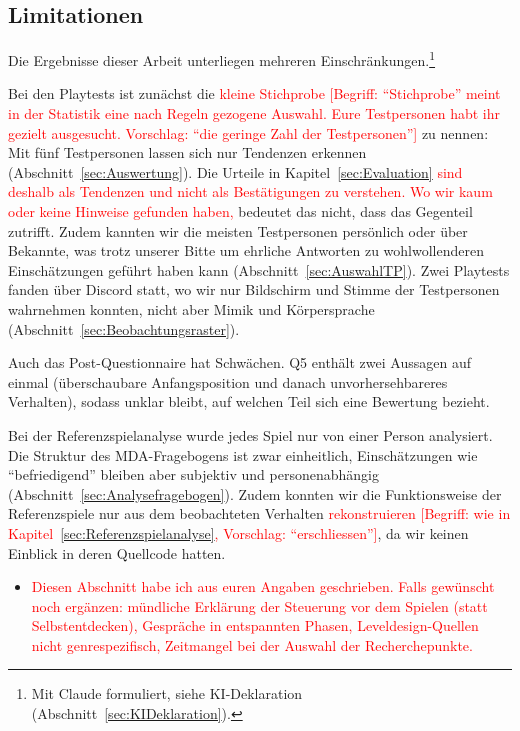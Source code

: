 \documentclass[../Main.tex]{subfiles}
\begin{document}
\subsection{Limitationen} \label{sec:Limitationen}

Die Ergebnisse dieser Arbeit unterliegen mehreren Einschränkungen.\footnote{Mit Claude formuliert, siehe KI-Deklaration (Abschnitt~\ref{sec:KIDeklaration}).}

Bei den Playtests ist zunächst die \textcolor{red}{kleine Stichprobe [Begriff: \enquote{Stichprobe} meint in der Statistik eine nach Regeln gezogene Auswahl. Eure Testpersonen habt ihr gezielt ausgesucht. Vorschlag: \enquote{die geringe Zahl der Testpersonen}]} zu nennen: Mit fünf Testpersonen lassen sich nur Tendenzen erkennen (Abschnitt~\ref{sec:Auswertung}). Die Urteile in Kapitel~\ref{sec:Evaluation} \textcolor{red}{sind deshalb als Tendenzen und nicht als Bestätigungen zu verstehen. Wo wir kaum oder keine Hinweise gefunden haben,} bedeutet das nicht, dass das Gegenteil zutrifft. Zudem kannten wir die meisten Testpersonen persönlich oder über Bekannte, was trotz unserer Bitte um ehrliche Antworten zu wohlwollenderen Einschätzungen geführt haben kann (Abschnitt~\ref{sec:AuswahlTP}). Zwei Playtests fanden über Discord statt, wo wir nur Bildschirm und Stimme der Testpersonen wahrnehmen konnten, nicht aber Mimik und Körpersprache (Abschnitt~\ref{sec:Beobachtungsraster}).

Auch das Post-Questionnaire hat Schwächen. Q5 enthält zwei Aussagen auf einmal (überschaubare Anfangsposition und danach unvorhersehbareres Verhalten), sodass unklar bleibt, auf welchen Teil sich eine Bewertung bezieht.

Bei der Referenzspielanalyse wurde jedes Spiel nur von einer Person analysiert. Die Struktur des MDA-Fragebogens ist zwar einheitlich, Einschätzungen wie \enquote{befriedigend} bleiben aber subjektiv und personenabhängig (Abschnitt~\ref{sec:Analysefragebogen}). Zudem konnten wir die Funktionsweise der Referenzspiele nur aus dem beobachteten Verhalten \textcolor{red}{rekonstruieren [Begriff: wie in Kapitel~\ref{sec:Referenzspielanalyse}, Vorschlag: \enquote{erschliessen}]}, da wir keinen Einblick in deren Quellcode hatten.

\begin{itemize}[leftmargin=1.5cm]
    \item \textcolor{red}{Diesen Abschnitt habe ich aus euren Angaben geschrieben. Falls gewünscht noch ergänzen: mündliche Erklärung der Steuerung vor dem Spielen (statt Selbstentdecken), Gespräche in entspannten Phasen, Leveldesign-Quellen nicht genrespezifisch, Zeitmangel bei der Auswahl der Recherchepunkte.}
\end{itemize}
\end{document}
